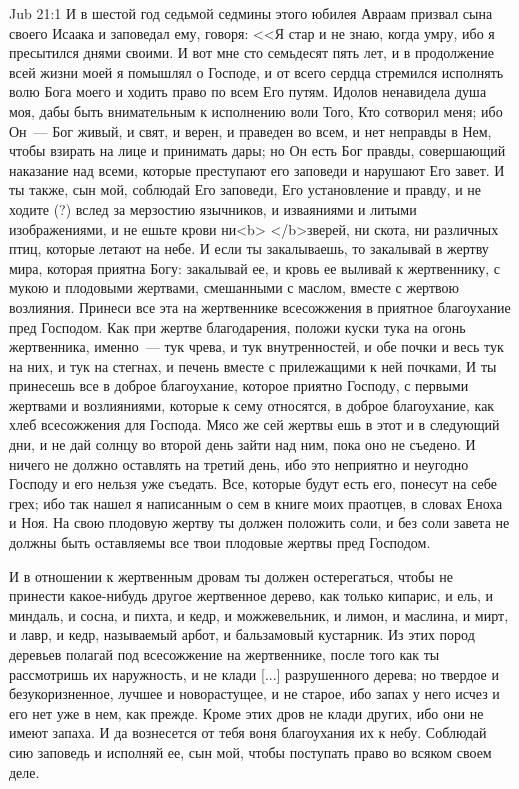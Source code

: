 \vs Jub 21:1
И в шестой год седьмой седмины этого юбилея
Авраам призвал сына своего Исаака и заповедал
ему, говоря: <<Я стар и не знаю, когда умру, ибо я
пресытился днями своими. И вот мне сто семьдесят
пять лет, и в продолжение всей жизни моей я
помышлял о Господе, и от всего сердца стремился
исполнять волю Бога моего и ходить право по всем
Его путям. Идолов ненавидела душа моя, дабы быть
внимательным к исполнению воли Того, Кто
сотворил меня; ибо Он~--- Бог живый, и свят, и верен, и
праведен во всем, и нет неправды в Нем, чтобы
взирать на лице и принимать дары; но Он есть Бог
правды, совершающий наказание над всеми, которые
преступают его заповеди и нарушают Его завет. И
ты также, сын мой, соблюдай Его заповеди, Его
установление и правду, и не ходите (?) вслед за
мерзостию язычников, и изваяниями и литыми
изображениями, и не ешьте крови ни<b> </b>зверей, ни
скота, ни различных птиц, которые летают на небе.
И если ты закалываешь, то закалывай в жертву мира,
которая приятна Богу: закалывай ее, и кровь ее
выливай к жертвеннику, с мукою и плодовыми
жертвами, смешанными с маслом, вместе с жертвою
возлияния. Принеси все эта на жертвеннике
всесожжения в приятное благоухание пред
Господом. Как при жертве благодарения, положи
куски тука на огонь жертвенника, именно~--- тук
чрева, и тук внутренностей, и обе почки и весь тук
на них, и тук на стегнах, и печень вместе с
прилежащими к ней почками, И ты принесешь все в
доброе благоухание, которое приятно Господу, с
первыми жертвами и возлияниями, которые к сему
относятся, в доброе благоухание, как хлеб
всесожжения для Господа. Мясо же сей жертвы ешь
в этот и в следующий дни, и не дай солнцу во второй
день зайти над ним, пока оно не съедено. И ничего
не должно оставлять на третий день, ибо это
неприятно и неугодно Господу и его нельзя уже
съедать. Все, которые будут есть его, понесут на
себе грех; ибо так нашел я написанным о сем в
книге моих праотцев, в словах Еноха и Ноя. На свою
плодовую жертву ты должен положить соли, и без
соли завета не должны быть оставляемы все твои
плодовые жертвы пред Господом.

И в отношении к жертвенным дровам ты должен
остерегаться, чтобы не принести какое-нибудь
другое жертвенное дерево, как только кипарис, и
ель, и миндаль, и сосна, и пихта, и кедр, и
можжевельник, и лимон, и маслина, и мирт, и лавр, и
кедр, называемый арбот, и бальзамовый кустарник.
Из этих пород деревьев полагай под всесожжение
на жертвеннике, после того как ты рассмотришь их
наружность, и не клади [...] разрушенного дерева; но
твердое и безукоризненное, лучшее и
новорастущее, и не старое, ибо запах у него исчез
и его нет уже в нем, как прежде. Кроме этих дров не
клади других, ибо они не имеют запаха. И да
вознесется от тебя воня благоухания их к небу.
Соблюдай сию заповедь и исполняй ее, сын мой,
чтобы поступать право во всяком своем деле.

